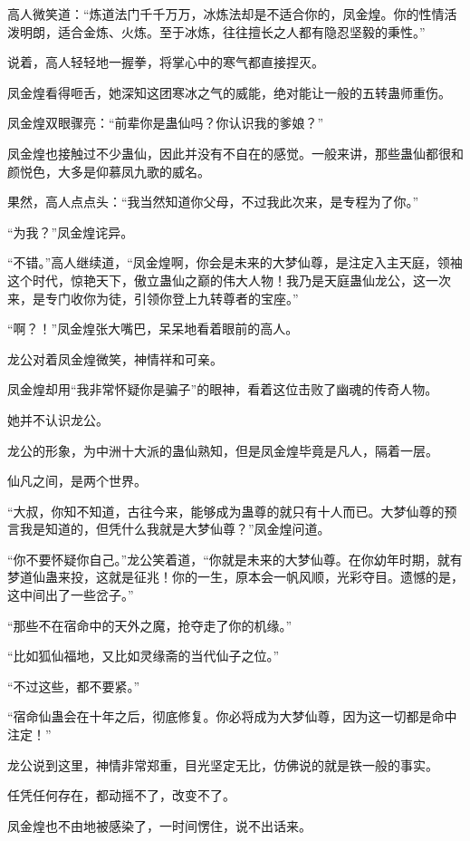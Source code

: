 \begin{this_body}
高人微笑道：“炼道法门千千万万，冰炼法却是不适合你的，凤金煌。你的性情活泼明朗，适合金炼、火炼。至于冰炼，往往擅长之人都有隐忍坚毅的秉性。”

说着，高人轻轻地一握拳，将掌心中的寒气都直接捏灭。

凤金煌看得咂舌，她深知这团寒冰之气的威能，绝对能让一般的五转蛊师重伤。

凤金煌双眼骤亮：“前辈你是蛊仙吗？你认识我的爹娘？”

凤金煌也接触过不少蛊仙，因此并没有不自在的感觉。一般来讲，那些蛊仙都很和颜悦色，大多是仰慕凤九歌的威名。

果然，高人点点头：“我当然知道你父母，不过我此次来，是专程为了你。”

“为我？”凤金煌诧异。

“不错。”高人继续道，“凤金煌啊，你会是未来的大梦仙尊，是注定入主天庭，领袖这个时代，惊艳天下，傲立蛊仙之巅的伟大人物！我乃是天庭蛊仙龙公，这一次来，是专门收你为徒，引领你登上九转尊者的宝座。”

“啊？！”凤金煌张大嘴巴，呆呆地看着眼前的高人。

龙公对着凤金煌微笑，神情祥和可亲。

凤金煌却用“我非常怀疑你是骗子”的眼神，看着这位击败了幽魂的传奇人物。

她并不认识龙公。

龙公的形象，为中洲十大派的蛊仙熟知，但是凤金煌毕竟是凡人，隔着一层。

仙凡之间，是两个世界。

“大叔，你知不知道，古往今来，能够成为蛊尊的就只有十人而已。大梦仙尊的预言我是知道的，但凭什么我就是大梦仙尊？”凤金煌问道。

“你不要怀疑你自己。”龙公笑着道，“你就是未来的大梦仙尊。在你幼年时期，就有梦道仙蛊来投，这就是征兆！你的一生，原本会一帆风顺，光彩夺目。遗憾的是，这中间出了一些岔子。”

“那些不在宿命中的天外之魔，抢夺走了你的机缘。”

“比如狐仙福地，又比如灵缘斋的当代仙子之位。”

“不过这些，都不要紧。”

“宿命仙蛊会在十年之后，彻底修复。你必将成为大梦仙尊，因为这一切都是命中注定！”

龙公说到这里，神情非常郑重，目光坚定无比，仿佛说的就是铁一般的事实。

任凭任何存在，都动摇不了，改变不了。

凤金煌也不由地被感染了，一时间愣住，说不出话来。

\end{this_body}

